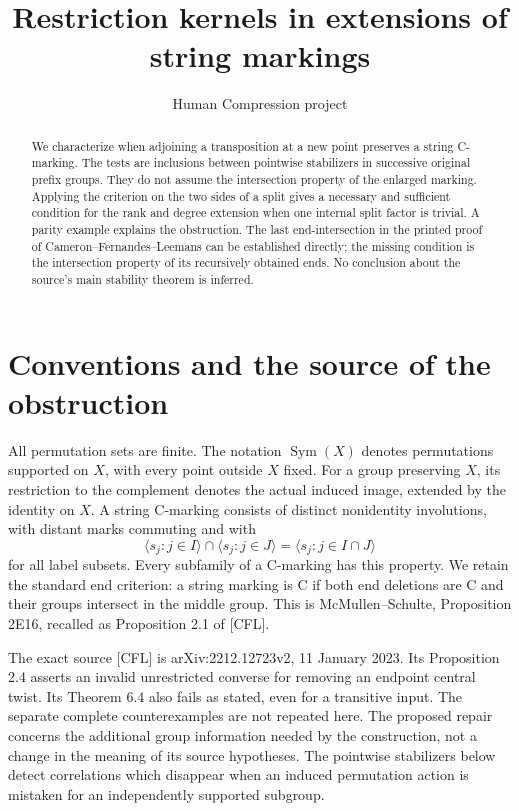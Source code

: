 \documentclass[a4paper,11pt]{article}
\title{Restriction kernels in extensions of string markings}
\author{Human Compression project}\date{}
\newcommand{\Sym}{\operatorname{Sym}}\newcommand{\Alt}{\operatorname{Alt}}
\newcommand{\gen}[1]{\langle#1\rangle}
\begin{document}
\maketitle
\begin{abstract}
We characterize when adjoining a transposition at a new point preserves a
string C-marking. The tests are inclusions between pointwise stabilizers in
successive original prefix groups. They do not assume the intersection
property of the enlarged marking. Applying the criterion on the two sides
of a split gives a necessary and sufficient condition for the rank and
degree extension when one internal split factor is trivial. A parity
example explains the obstruction. The last end-intersection in the printed
proof of Cameron--Fernandes--Leemans can be established directly; the missing
condition is the intersection property of its recursively obtained ends.
No conclusion about the source's main stability theorem is inferred.
\end{abstract}

\section{Conventions and the source of the obstruction}
All permutation sets are finite. The notation $\Sym(X)$ denotes permutations
supported on $X$, with every point outside $X$ fixed. For a group preserving
$X$, its restriction to the complement denotes the actual induced image,
extended by the identity on $X$. A string C-marking consists of distinct
nonidentity involutions, with distant marks commuting and with
\[
 \gen{s_j:j\in I}\cap\gen{s_j:j\in J}=\gen{s_j:j\in I\cap J}
\]
for all label subsets. Every subfamily of a C-marking has this property.
We retain the standard end criterion: a string marking is C if both end
deletions are C and their groups intersect in the middle group. This is
McMullen--Schulte, Proposition 2E16, recalled as Proposition 2.1 of [CFL].

The exact source [CFL] is arXiv:2212.12723v2, 11 January 2023. Its
Proposition 2.4 asserts an invalid unrestricted converse for removing an
endpoint central twist. Its Theorem 6.4 also fails as stated, even for a
transitive input. The separate complete counterexamples are not repeated
here. The proposed repair concerns the additional group information needed
by the construction, not a change in the meaning of its source hypotheses.
The pointwise stabilizers below detect correlations which disappear when
an induced permutation action is mistaken for an independently supported
subgroup.
\end{document}
